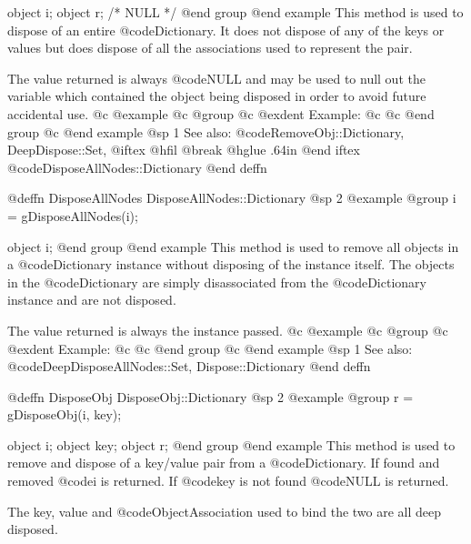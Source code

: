 object  i;
object  r;     /*  NULL  */
@end group
@end example
This method is used to dispose of an entire @code{Dictionary}.  It does not
dispose of any of the keys or values but does dispose of all the
associations used to represent the pair.  

The value returned is always @code{NULL} and may be used to null out
the variable which contained the object being disposed in order to
avoid future accidental use.
@c @example
@c @group
@c @exdent Example:
@c 
@c @end group
@c @end example
@sp 1
See also:  @code{RemoveObj::Dictionary, DeepDispose::Set,}
@iftex
@hfil @break @hglue .64in      
@end iftex
@code{DisposeAllNodes::Dictionary}
@end deffn
















@deffn {DisposeAllNodes} DisposeAllNodes::Dictionary
@sp 2
@example
@group
i = gDisposeAllNodes(i);

object  i;
@end group
@end example
This method is used to remove all objects in a @code{Dictionary}
instance without disposing of the instance itself.  The objects in the
@code{Dictionary} are simply disassociated from the @code{Dictionary}
instance and are not disposed.

The value returned is always the instance passed.
@c @example
@c @group
@c @exdent Example:
@c 
@c @end group
@c @end example
@sp 1
See also:  @code{DeepDisposeAllNodes::Set, Dispose::Dictionary}
@end deffn






















@deffn {DisposeObj} DisposeObj::Dictionary
@sp 2
@example
@group
r = gDisposeObj(i, key);

object  i;
object  key;
object  r;
@end group
@end example
This method is used to remove and dispose of a key/value pair from a
@code{Dictionary}.  If found and removed @code{i} is returned.  If @code{key}
is not found @code{NULL} is returned.

The key, value and @code{ObjectAssociation} used to bind the two are all deep
disposed.

